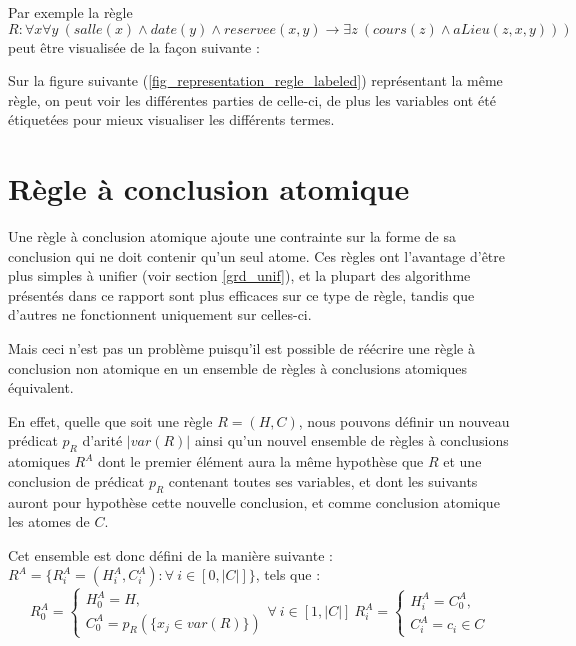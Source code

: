 Par exemple la règle 
$R : \forall x \forall y\ (salle(x) \wedge date(y) \wedge reservee(x,y) 
\rightarrow \exists z\ (cours(z) \wedge aLieu(z,x,y)))$ 
peut être visualisée de la façon suivante :


Sur la figure suivante (\ref{fig_representation_regle_labeled})
représentant la même règle, on peut voir les différentes parties
de celle-ci, de plus les variables ont été étiquetées pour mieux visualiser les
différents termes.




\section{Règle à conclusion atomique}\label{def_regle_atomique}
Une règle à conclusion atomique ajoute une contrainte sur la forme de sa conclusion qui
ne doit contenir qu'un seul atome.
Ces règles ont l'avantage d'être plus simples à unifier (voir section \ref{grd_unif}), et
la plupart des algorithme présentés dans ce rapport sont plus efficaces sur ce type de
règle, tandis que d'autres ne fonctionnent uniquement sur celles-ci.

Mais ceci n'est pas un problème puisqu'il est possible de réécrire une règle à
conclusion non atomique en un ensemble de règles à conclusions atomiques équivalent.

En effet, quelle que soit une règle $R = (H,C)$, nous pouvons définir un nouveau prédicat
$p_R$ d'arité $|var(R)|$ ainsi qu'un nouvel ensemble de règles à conclusions atomiques 
$R^{A}$ dont le premier
élément aura la même hypothèse que $R$ et une conclusion de prédicat $p_R$ contenant 
toutes ses variables, et dont les suivants auront pour hypothèse cette nouvelle
conclusion, et comme conclusion atomique les atomes de $C$.

Cet ensemble est donc défini de la manière suivante :\\
$R^{A} =\{R^{A}_i = (H^{A}_i,C^{A}_i) : \forall\ i \in [0,|C|]\}$, tels que :\\
$$
	R^{A}_0 =
	\begin{cases}
		H^{A}_0 = H,\\
		C^{A}_0 = p_R(\{x_j \in var(R)\})
	\end{cases}
	\forall\ i \in [1,|C|]\ R^{A}_i =
	\begin{cases}
		H^{A}_i = C^{A}_0,\\
		C^{A}_i = c_i \in C
	\end{cases}
$$

